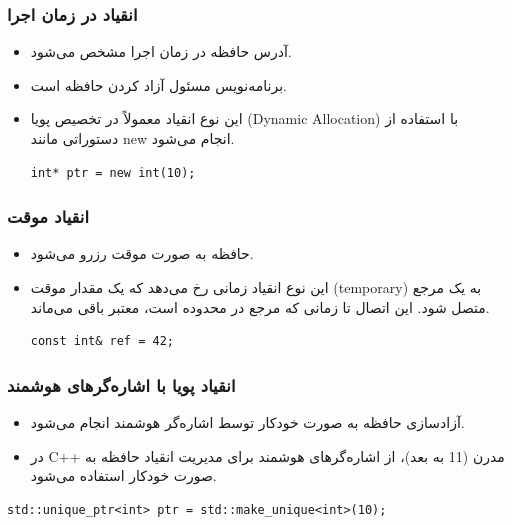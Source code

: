 \documentclass{article}
\begin{document}
\subsubsection*{انقیاد در زمان اجرا}
\begin{itemize}
    \item آدرس حافظه در زمان اجرا مشخص می‌شود.
    \item برنامه‌نویس مسئول آزاد کردن حافظه است.
    \item این نوع انقیاد معمولاً در تخصیص پویا (Dynamic Allocation) با استفاده از دستوراتی مانند new انجام می‌شود.


\begin{LTR} %
\begin{lstlisting}
int* ptr = new int(10);
\end{lstlisting}
\end{LTR}
\end{itemize}


\subsubsection*{انقیاد موقت}
\begin{itemize}
    \item حافظه به صورت موقت رزرو می‌شود.
    \item این نوع انقیاد زمانی رخ می‌دهد که یک مقدار موقت (temporary) به یک مرجع متصل شود. این اتصال تا زمانی که مرجع در محدوده است، معتبر باقی می‌ماند.


\begin{LTR} %
\begin{lstlisting}
const int& ref = 42;
\end{lstlisting}
\end{LTR}
\end{itemize}


\subsubsection*{انقیاد پویا با اشاره‌گرهای هوشمند}
\begin{itemize}
    \item آزادسازی حافظه به صورت خودکار توسط اشاره‌گر هوشمند انجام می‌شود.
    \item در C++ مدرن (11 به بعد)، از اشاره‌گرهای هوشمند برای مدیریت انقیاد حافظه به صورت خودکار استفاده می‌شود.
\end{itemize}

\begin{LTR} %
\begin{lstlisting}
std::unique_ptr<int> ptr = std::make_unique<int>(10);
\end{lstlisting}
\end{LTR}
\end{document}

